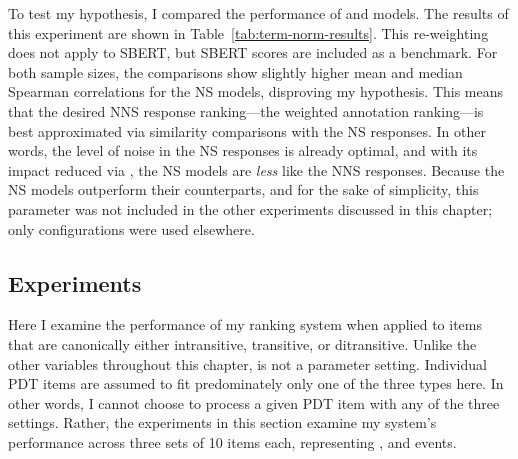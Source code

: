 To test my hypothesis, I compared the performance of  and  models. 
The results of this experiment are shown in Table~\ref{tab:term-norm-results}. This re-weighting does not apply to SBERT, but SBERT scores are included as a benchmark. For both sample sizes, the comparisons show slightly higher mean and median Spearman correlations for the  NS models, disproving my hypothesis. This means that the desired NNS response ranking---the weighted annotation ranking---is best approximated via similarity comparisons with the  NS responses. In other words, the level of noise in the NS responses is already optimal, and with its impact reduced via , the NS models are \textit{less} like the NNS responses. Because the  NS models outperform their  counterparts, and for the sake of simplicity, this parameter was not included in the other experiments discussed in this chapter; only  configurations were used elsewhere.

\subsection{ Experiments}
\label{sec:exp-transitivity}
Here I examine the performance of my ranking system when applied to items that are canonically either intransitive, transitive, or ditransitive. Unlike the other variables throughout this chapter,  is not a parameter setting. Individual PDT items are assumed to fit predominately only one of the three types here. In other words, I cannot choose to process a given PDT item with any of the three  settings. Rather, the experiments in this section examine my system's performance across three sets of 10 items each, representing ,  and  events.


